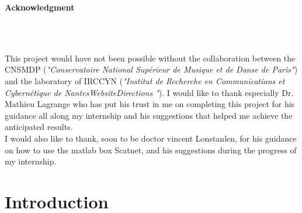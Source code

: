 \documentclass[hidelinks,12pt]{report}
\begin{document}
\begin{center}
\begin{large}
\textbf{Acknowledgment} 
\end{large}\\~\\
\end{center}
\par This project would have not been possible without the collaboration between the CNSMDP  (\textit{"Conservatoire National Supérieur de Musique et de Danse de Paris"}) and the laboratory of IRCCYN (\textit{"Institut de Recherche en Communications et Cybernétique de NantesWebsiteDirections
"}). I would like to thank especially Dr. Mathieu Lagrange who has put his trust in me on completing this project for his guidance all along my internship and his suggestions that helped me achieve the anticipated results.\\ I would also like to thank, soon to be doctor vincent Lonstanlen, for his guidance on how to use the matlab box Scatnet, and his suggestions during the progress of my internship.
\thispagestyle{empty}
\newpage
\tableofcontents
\thispagestyle{empty}
\newpage
\clearpage
\thispagestyle{empty}
\newpage
\listoffigures
\thispagestyle{empty}
\newpage
\clearpage
\setcounter{page}{1}
\noindent




\chapter{Introduction}
\end{document}
